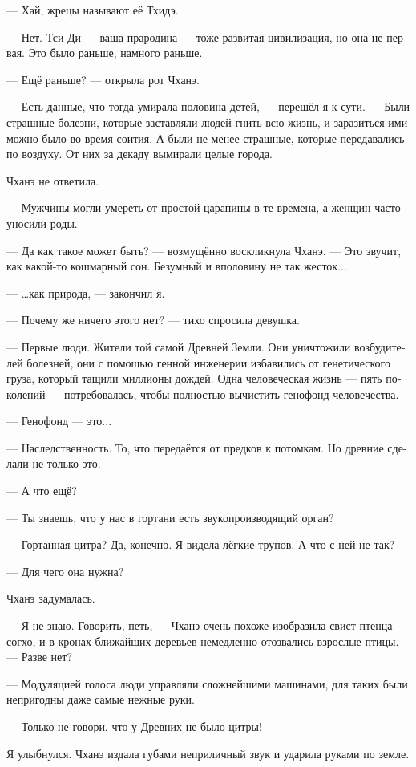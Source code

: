 \documentclass[a4paper,12pt,fleqn]{book}\usepackage{polyglossia}\setdefaultlanguage[babelshorthands=true]{russian}\setotherlanguage{english}\defaultfontfeatures{Ligatures=TeX,Mapping=tex-text}\usepackage{xcolor}\newcommand{\ml}[3]{#2}
\begin{document}
{--- Хай, жрецы называют её Тхидэ.

--- Нет.
Тси-Ди --- ваша прародина --- тоже развитая цивилизация, но она не первая.
Это было раньше, намного раньше.

--- Ещё раньше? --- открыла рот Чханэ.

--- Есть данные, что тогда умирала половина детей, --- перешёл я к сути.
--- Были страшные болезни, которые заставляли людей гнить всю жизнь, и заразиться ими можно было во время соития.
А были не менее страшные, которые передавались по воздуху.
От них за декаду вымирали целые города.

Чханэ не ответила.

--- Мужчины могли умереть от простой царапины в те времена, а женщин часто уносили роды.

--- Да как такое может быть? --- возмущённо воскликнула Чханэ.
--- Это звучит, как какой-то кошмарный сон.
Безумный и вполовину не так жесток...

--- \ldots как природа, --- закончил я.

--- Почему же ничего этого нет? --- тихо спросила девушка.

--- Первые люди.
Жители той самой Древней Земли.
Они уничтожили возбудителей болезней, они с помощью генной инженерии избавились от генетического груза, который тащили миллионы дождей.
Одна человеческая жизнь --- пять поколений --- потребовалась, чтобы полностью вычистить генофонд человечества.

--- Генофонд --- это...

--- Наследственность.
То, что передаётся от предков к потомкам.
Но древние сделали не только это.

--- А что ещё?

--- Ты знаешь, что у нас в гортани есть звукопроизводящий орган?

--- Гортанная цитра?
Да, конечно.
Я видела лёгкие трупов.
А что с ней не так?

--- Для чего она нужна?

Чханэ задумалась.

--- Я не знаю.
Говорить, петь, --- Чханэ очень похоже изобразила свист птенца согхо, и в кронах ближайших деревьев немедленно отозвались взрослые птицы.
--- Разве нет?

--- Модуляцией голоса люди управляли сложнейшими машинами, для таких были непригодны даже самые нежные руки.

--- Только не говори, что у Древних не было цитры!

Я улыбнулся.
Чханэ издала губами неприличный звук и ударила руками по земле.

}
\end{document}
